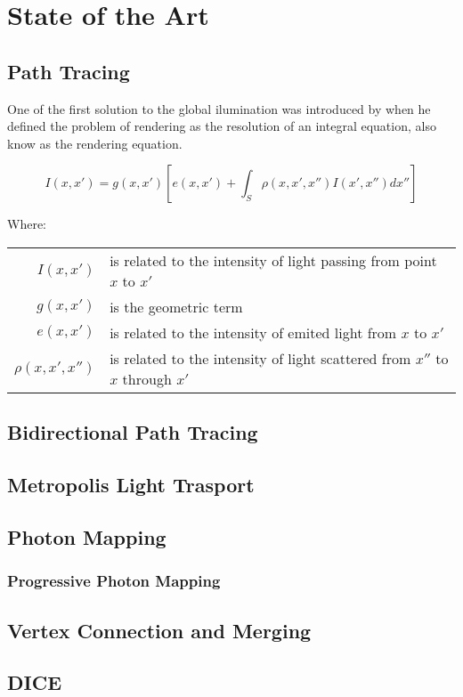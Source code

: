 \chapter{State of the Art}

\section{Path Tracing}

One of the first solution to the global ilumination was introduced by \cite{Kajiya} when he defined the problem of rendering as the resolution of an integral equation, also know as the rendering equation.

\begin{equation}
I(x,x')=g(x,x')[e(x,x')+\int_{S}^{} \rho(x,x',x'')I(x',x'')dx'']
\label{eq:render_eq}
\end{equation}

Where:

\begin{tabular}{r l}
$I(x,x')$ & is related to the intensity of light passing from point $x$ to $x'$ \\
$g(x,x')$ & is the geometric term \\
$e(x,x')$ & is related to the intensity of emited light from $x$ to $x'$ \\
$\rho(x,x',x'')$ & is related to the intensity of light scattered from $x''$ to $x$ through $x'$\\

\end{tabular}



\section{Bidirectional Path Tracing}






\section{Metropolis Light Trasport}





\section{Photon Mapping}
\subsection{Progressive Photon Mapping}




\section{Vertex Connection and Merging}




\section{DICE}